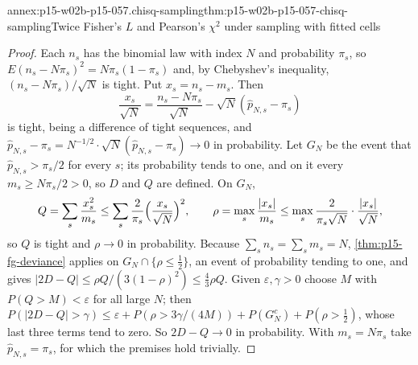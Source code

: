 \begin{annexitem}{annex:p15-w02b-p15-057.chisq-sampling}{thm:p15-w02b-p15-057-chisq-sampling}{Twice Fisher's \(L\) and Pearson's \(\chi^2\) under sampling with fitted cells}
\begin{proof}
Each \(n_s\) has the binomial law with index \(N\) and probability
\(\pi_s\), so \(E(n_s-N\pi_s)^2=N\pi_s(1-\pi_s)\) and, by Chebyshev's
inequality, \((n_s-N\pi_s)/\sqrt N\) is tight. Put \(x_s=n_s-m_s\). Then
\[
 \frac{x_s}{\sqrt N}=\frac{n_s-N\pi_s}{\sqrt N}-\sqrt N(\hat p_{N,s}-\pi_s)
\]
is tight, being a difference of tight sequences, and
\(\hat p_{N,s}-\pi_s=N^{-1/2}\cdot\sqrt N(\hat p_{N,s}-\pi_s)\to0\) in
probability. Let \(G_N\) be the event that \(\hat p_{N,s}>\pi_s/2\) for
every \(s\); its probability tends to one, and on it every \(m_s\geq
N\pi_s/2>0\), so \(D\) and \(Q\) are defined. On \(G_N\),
\[
 Q=\sum_s\frac{x_s^2}{m_s}\leq\sum_s\frac2{\pi_s}\Bigl(\frac{x_s}{\sqrt N}
 \Bigr)^2,\qquad
 \rho=\max_s\frac{|x_s|}{m_s}\leq\max_s\frac2{\pi_s\sqrt N}\cdot
 \frac{|x_s|}{\sqrt N},
\]
so \(Q\) is tight and \(\rho\to0\) in probability. Because
\(\sum_sn_s=\sum_sm_s=N\), \cref{thm:p15-fg-deviance} applies on
\(G_N\cap\{\rho\leq\frac12\}\), an event of probability tending to one,
and gives \(|2D-Q|\leq\rho Q/(3(1-\rho)^2)\leq\frac43\rho Q\). Given
\(\varepsilon,\gamma>0\) choose \(M\) with \(P(Q>M)<\varepsilon\) for all
large \(N\); then \(P(|2D-Q|>\gamma)\leq\varepsilon+P(\rho>3\gamma/(4M))
+P(G_N^c)+P(\rho>\tfrac12)\), whose last three terms tend to zero. So
\(2D-Q\to0\) in probability. With \(m_s=N\pi_s\) take
\(\hat p_{N,s}=\pi_s\), for which the premises hold trivially.
\end{proof}
\end{annexitem}

